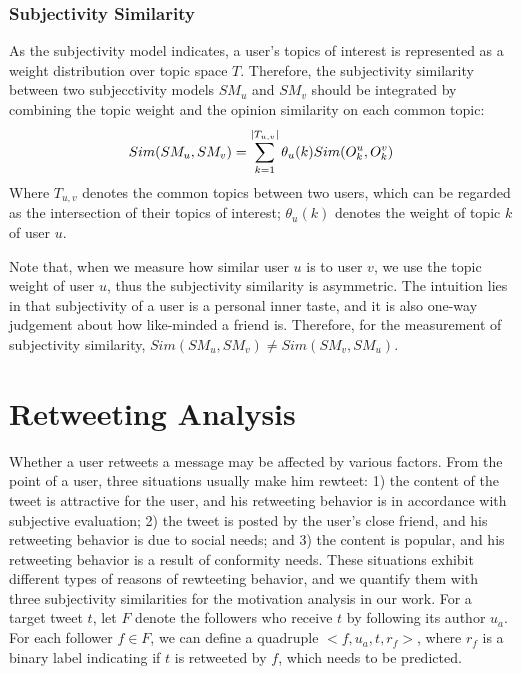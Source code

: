\documentclass[letterpaper]{article}
\begin{document}
\subsubsection{Subjectivity Similarity}

As the subjectivity model indicates, a user's topics of interest is represented as a weight distribution over topic space $ T $. Therefore, the subjectivity similarity between two subjecctivity models $SM_u$ and $SM_v$ should be integrated by combining the topic weight and the opinion similarity on each common topic:
\begin{equation}
\label{subsim}
Sim(SM_{u},SM_{v})=\sum_{k=1}^{|T_{u,v}|}\theta_{u}(k)\* Sim(O_{k}^{u},O_{k}^{v})
\end{equation}
Where $ T_{u,v} $ denotes the common topics between two users, which can be regarded as the intersection of their topics of interest; $ \theta_{u}(k) $ denotes the weight of topic $ k $ of user $ u $.

Note that, when we measure how similar user $ u $ is to user $ v $, we use the topic weight of user $ u $, thus the subjectivity similarity is asymmetric. The intuition lies in that subjectivity of a user is a personal inner taste, and it is also one-way judgement about how like-minded a friend is. Therefore, for the measurement of subjectivity similarity, $ Sim(SM_u,SM_v)\neq Sim(SM_v,SM_u)$.

\section{Retweeting Analysis}
\label{retweet}

Whether a user retweets a message may be affected by various factors. 
From the point of a user, three situations usually make him rewteet: 1) the content of the tweet is attractive for the user, and his retweeting behavior is in accordance with subjective evaluation; 2) the tweet is posted by the user's close friend, and his retweeting behavior is due to social needs; and 3) the content is popular, and his retweeting behavior is a result of conformity needs\cite{cialdini2004social}. These situations exhibit different types of reasons of rewteeting behavior, and we quantify them with three subjectivity similarities for the motivation analysis in our work. 
For a target tweet $ t $, let $ F $ denote the followers who receive $ t $ by following its author $ u_{a} $. 
For each follower $ f \in F $, we can define a quadruple $ <f, u_{a}, t, r_{f}>  $, where $ r_{f} $ is a binary label indicating if $ t $ is retweeted by $ f $, which needs to be predicted.
\end{document}
